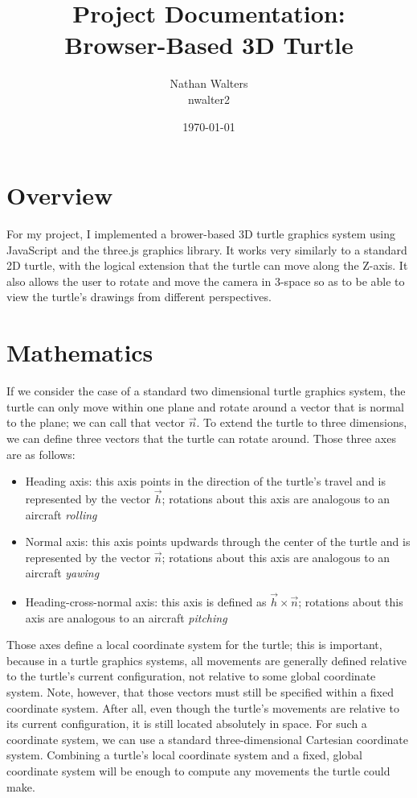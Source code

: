 \documentclass[12pt]{article}
\title{Project Documentation:\\Browser-Based 3D Turtle}
\author{Nathan Walters\\nwalter2}
\date{\today}
\begin{document}
\maketitle

\section{Overview}

For my project, I implemented a brower-based 3D turtle graphics system using JavaScript and the three.js graphics library. It works very similarly to a standard 2D turtle, with the logical extension that the turtle can move along the Z-axis. It also allows the user to rotate and move the camera in 3-space so as to be able to view the turtle's drawings from different perspectives.

\section{Mathematics}

If we consider the case of a standard two dimensional turtle graphics system, the turtle can only move within one plane and rotate around a vector that is normal to the plane; we can call that vector $\vec{n}$. To extend the turtle to three dimensions, we can define three vectors that the turtle can rotate around. Those three axes are as follows:

\begin{itemize}
\item Heading axis: this axis points in the direction of the turtle's travel and is represented by the vector $\vec{h}$; rotations about this axis are analogous to an aircraft \textit{rolling}
\item Normal axis: this axis points updwards through the center of the turtle and is represented by the vector $\vec{n}$; rotations about this axis are analogous to an aircraft \textit{yawing}
\item Heading-cross-normal axis: this axis is defined as $\vec{h} \times \vec{n}$; rotations about this axis are analogous to an aircraft \textit{pitching}
\end{itemize}

Those axes define a local coordinate system for the turtle; this is important, because in a turtle graphics systems, all movements are generally defined relative to the turtle's current configuration, not relative to some global coordinate system. Note, however, that those vectors must still be specified within a fixed coordinate system. After all, even though the turtle's movements are relative to its current configuration, it is still located absolutely in space. For such a coordinate system, we can use a standard three-dimensional Cartesian coordinate system. Combining a turtle's local coordinate system and a fixed, global coordinate system will be enough to compute any movements the turtle could make.
\end{document}
